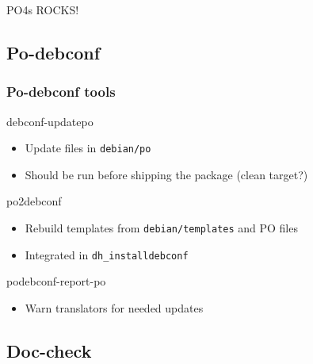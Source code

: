 \documentclass{beamer}
\begin{document}
\begin{frame}
  \frametitle{}
\begin{centering}
	\color{red}
	\huge{PO4s ROCKS!}
	\color{black}
\end{centering}
\end{frame}

\subsection{Po-debconf}

\begin{frame}
  \frametitle{Po-debconf tools}
	\begin{block}
		{debconf-updatepo}
		\begin{itemize}
		\item
			{Update files in \texttt{debian/po}}
		\item
			Should be run before shipping the package (clean target?)
		\end{itemize}
	\end{block}
	\begin{block}
		{po2debconf}
		\begin{itemize}
		\item
			Rebuild templates from \texttt{debian/templates} and PO files
		\item
			Integrated in \texttt{dh\_installdebconf}
		\end{itemize}
	\end{block}
	\begin{block}
		{podebconf-report-po}
		\begin{itemize}
		\item
			Warn translators for needed updates
		\end{itemize}
	\end{block}
\end{frame}


\subsection{Doc-check}
\end{document}
